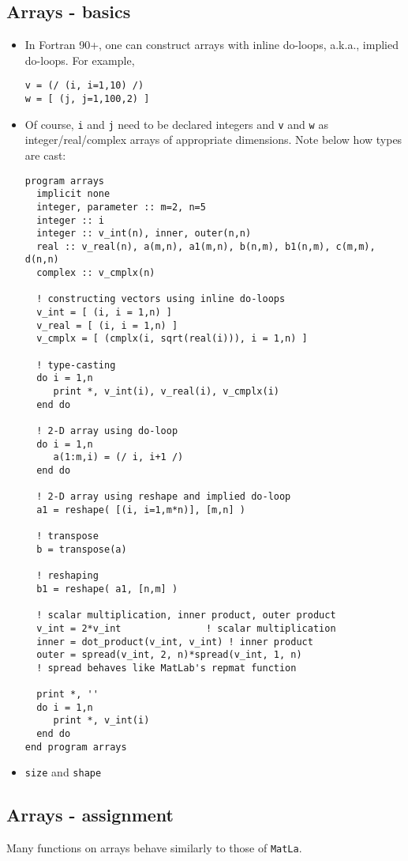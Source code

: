 \documentclass[11pt]{article}
\begin{document}
\subsection{Arrays - basics}
\label{sec:org36ec673}
\begin{itemize}
\item In Fortran 90+, one can construct arrays with inline do-loops, a.k.a., implied do-loops. For example,
\begin{verbatim}
v = (/ (i, i=1,10) /)
w = [ (j, j=1,100,2) ]
\end{verbatim}

\item Of course, \texttt{i} and \texttt{j} need to be declared integers and \texttt{v} and \texttt{w}
as integer/real/complex arrays of appropriate dimensions. Note
below how types are cast:
\begin{verbatim}
program arrays
  implicit none
  integer, parameter :: m=2, n=5
  integer :: i
  integer :: v_int(n), inner, outer(n,n)
  real :: v_real(n), a(m,n), a1(m,n), b(n,m), b1(n,m), c(m,m), d(n,n)
  complex :: v_cmplx(n)

  ! constructing vectors using inline do-loops
  v_int = [ (i, i = 1,n) ]
  v_real = [ (i, i = 1,n) ]
  v_cmplx = [ (cmplx(i, sqrt(real(i))), i = 1,n) ]

  ! type-casting
  do i = 1,n
     print *, v_int(i), v_real(i), v_cmplx(i)
  end do

  ! 2-D array using do-loop
  do i = 1,n
     a(1:m,i) = (/ i, i+1 /)
  end do

  ! 2-D array using reshape and implied do-loop
  a1 = reshape( [(i, i=1,m*n)], [m,n] )

  ! transpose
  b = transpose(a)

  ! reshaping
  b1 = reshape( a1, [n,m] )

  ! scalar multiplication, inner product, outer product
  v_int = 2*v_int               ! scalar multiplication
  inner = dot_product(v_int, v_int) ! inner product
  outer = spread(v_int, 2, n)*spread(v_int, 1, n)
  ! spread behaves like MatLab's repmat function

  print *, ''
  do i = 1,n
     print *, v_int(i)
  end do
end program arrays
\end{verbatim}

\item \texttt{size} and \texttt{shape}
\end{itemize}
\subsection{Arrays - assignment}
\label{sec:org7b8765f}
Many functions on arrays behave similarly to those of \texttt{MatLa}.
\end{document}

